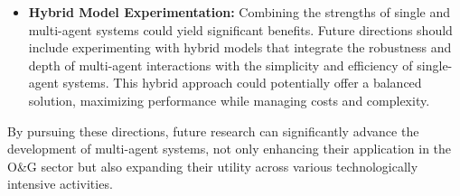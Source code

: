 \begin{itemize}
                    \item \textbf{Hybrid Model Experimentation:}
                        Combining the strengths of single and multi-agent systems could yield significant benefits. Future directions should include experimenting with hybrid models that integrate the robustness and depth of multi-agent interactions with the simplicity and efficiency of single-agent systems. This hybrid approach could potentially offer a balanced solution, maximizing performance while managing costs and complexity.
                        

                \end{itemize}
                
                By pursuing these directions, future research can significantly advance the development of multi-agent systems, not only enhancing their application in the O\&G sector but also expanding their utility across various technologically intensive activities.
                    